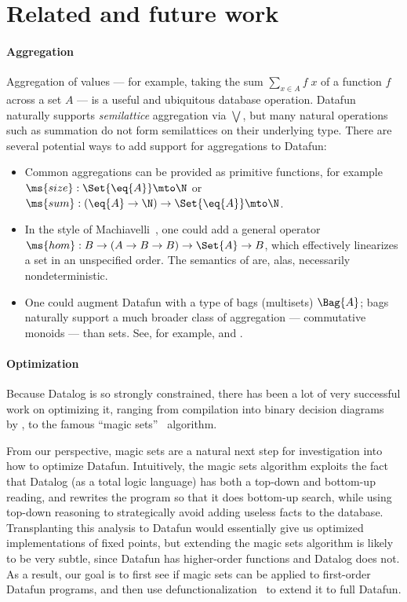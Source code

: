 \section{Related and future work}
\label{sec:futurework}

\paragraph{Aggregation}
Aggregation of values --- for example, taking the sum $\sum_{x \in A} f \;x$ of
a function $f$ across a set $A$ --- is a useful and ubiquitous database
operation. Datafun naturally supports \emph{semilattice} aggregation via
$\bigvee$, but many natural operations such as summation do not form
semilattices on their underlying type. There are several potential ways to add
support for aggregations to Datafun:
\begin{itemize}
\item Common aggregations can be provided as primitive functions, for example
  $\ms{size} : \Set{\eq{A}} \mto \N$ or $\ms{sum} : (\eq{A} \to \N) \uto
  \Set{\eq{A}} \mto \N$.

\item In the style of Machiavelli~\cite{machiavelli}, one could add a general
  operator $\ms{hom} : B \to (A \uto B \uto B) \uto \Set{A} \uto B$, which
  effectively linearizes a set in an unspecified order. The semantics of
   are, alas, necessarily nondeterministic.

\item One could augment Datafun with a type of bags (multisets) $\Bag{A}$; bags
  naturally support a much broader class of aggregation --- commutative monoids
  --- than sets. See, for example, \citet{multilinear-bigdata} and
  \citet{reladj}.
\end{itemize}

\paragraph{Optimization} Because Datalog is so strongly constrained,
there has been a lot of very successful work on optimizing it, ranging
from compilation into binary decision diagrams~\cite{bdd} by
\citet{whaley-lam}, to the famous ``magic sets''~\cite{magicsets}
algorithm.

From our perspective, magic sets are a natural next step for
investigation into how to optimize Datafun. Intuitively, the magic
sets algorithm exploits the fact that Datalog (as a total logic
language) has both a top-down and bottom-up reading, and rewrites the
program so that it does bottom-up search, while using top-down
reasoning to strategically avoid adding useless facts to the
database. Transplanting this analysis to Datafun would essentially
give us optimized implementations of fixed points, but extending the
magic sets algorithm is likely to be very subtle, since Datafun has
higher-order functions and Datalog does not. As a result, our goal is
to first see if magic sets can be applied to first-order Datafun programs,
and then use defunctionalization~\cite{defunctionalization} to
extend it to full Datafun.

